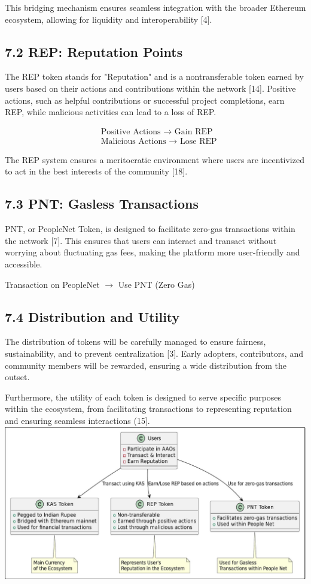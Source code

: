 \documentclass[10pt]{article}
\begin{document}
This bridging mechanism ensures seamless integration with the broader Ethereum ecosystem, allowing for liquidity and interoperability [4].

\subsection*{7.2 REP: Reputation Points}
The REP token stands for "Reputation" and is a nontransferable token earned by users based on their actions and contributions within the network [14]. Positive actions, such as helpful contributions or successful project completions, earn REP, while malicious activities can lead to a loss of REP.


\begin{align*}
& \text { Positive Actions } \rightarrow \text { Gain REP }  \tag{4}\\
& \text { Malicious Actions } \rightarrow \text { Lose REP } \tag{5}
\end{align*}


The REP system ensures a meritocratic environment where users are incentivized to act in the best interests of the community [18].

\subsection*{7.3 PNT: Gasless Transactions}
PNT, or PeopleNet Token, is designed to facilitate zero-gas transactions within the network [7]. This ensures that users can interact and transact without worrying about fluctuating gas fees, making the platform more user-friendly and accessible.

Transaction on PeopleNet $\rightarrow$ Use PNT (Zero Gas)

\subsection*{7.4 Distribution and Utility}
The distribution of tokens will be carefully managed to ensure fairness, sustainability, and to prevent centralization [3]. Early adopters, contributors, and community members will be rewarded, ensuring a wide distribution from the outset.

Furthermore, the utility of each token is designed to serve specific purposes within the ecosystem, from facilitating transactions to representing reputation and ensuring seamless interactions (15].\\
\includegraphics[max width=\textwidth, center]{2025_03_06_545dea0014012947d15fg-07}
\end{document}
